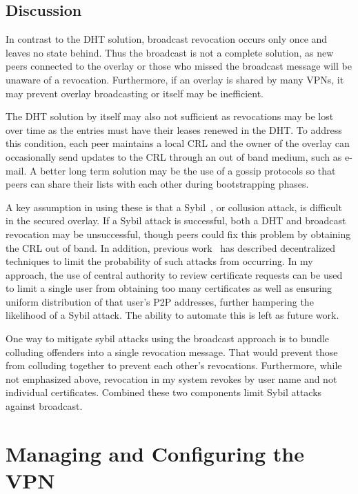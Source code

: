 \subsection{Discussion}

In contrast to the DHT solution, broadcast revocation occurs only once and
leaves no state behind.  Thus the broadcast is not a complete solution, as new
peers connected to the overlay or those who missed the broadcast message will
be unaware of a revocation.  Furthermore, if an overlay is shared by many VPNs,
it may prevent overlay broadcasting or itself may be inefficient.

The DHT solution by itself may also not sufficient as revocations may be lost
over time as the entries must have their leases renewed in the DHT.  To address
this condition, each peer maintains a local CRL and the owner of the overlay
can occasionally send updates to the CRL through an out of band medium, such as
e-mail.  A better long term solution may be the use of a gossip protocols so
that peers can share their lists with each other during bootstrapping phases.

A key assumption in using these is that a Sybil~\cite{sybil}, or collusion
attack, is difficult in the secured overlay.	 If a Sybil attack is successful,
both a DHT and broadcast revocation may be unsuccessful, though peers could fix
this problem by obtaining the CRL out of band.  In addition, previous
work~\cite{secure_routing} has described decentralized techniques to limit the
probability of such attacks from occurring.  In my approach, the use of central
authority to review certificate requests can be used to limit a single user
from obtaining too many certificates as well as ensuring uniform distribution
of that user's P2P addresses, further hampering the likelihood of a Sybil
attack.  The ability to automate this is left as future work.

One way to mitigate sybil attacks using the broadcast approach is to bundle
colluding offenders into a single revocation message.  That would prevent those
from colluding together to prevent each other's revocations.  Furthermore,
while not emphasized above, revocation in my system revokes by user name and
not individual certificates.  Combined these two components limit Sybil attacks
against broadcast.

\section{Managing and Configuring the VPN}
\label{vpn:groupvpn}

